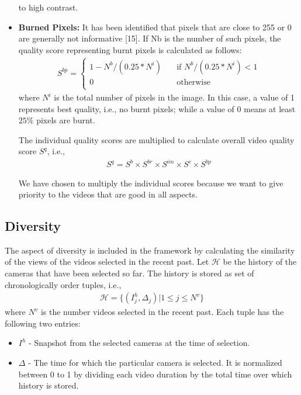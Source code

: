 \documentclass{sig-alternate-05-2015}
\begin{document}
\begin{itemize}
to high contrast.
\item \textbf{Burned Pixels:}
It has been identified that pixels that are
close to 255 or 0 are generally not informative [15]. If Nb
is the number of such pixels, the quality score representing
burnt pixels is calculated as follows:
\begin{eqnarray}
S^{bp}=
\begin{cases}
	1-N^b/(0.25*N^i) &\quad\text{if $N^b/(0.25*N^i)<1$}\\
	0 &\quad\text{otherwise}\\
\end{cases}
\end{eqnarray}
where $N^i$ is the total number of pixels in the image. In this
case, a value of 1 represents best quality, i.e., no burnt pixels;
while a value of 0 means at least $25\%$ pixels are burnt.

The individual quality scores are multiplied to calculate overall
video quality score $S^q$, i.e.,
\begin{eqnarray}
S^q = S^b \times S^{br} \times S^{im} \times S^c \times S^{bp}
\end{eqnarray}

We have chosen to multiply the individual scores because we
want to give priority to the videos that are good in all aspects.
\end{itemize}

\subsection{Diversity}

The aspect of diversity is included in the framework by calculating
the similarity of the views of the videos selected in the recent
past. Let $\mathcal{H}$ be the history of the cameras that have been selected
so far. The history is stored as set of chronologically order tuples,
i.e.,
\begin{eqnarray}
\mathcal{H}=\{(I^h_j ,\Delta_j)|1 \leq j \leq N^v\}
\end{eqnarray}
where $N^v$ is the number videos selected in the recent past. Each
tuple has the following two entries:
\begin{itemize}
\item $I^h$ - Snapshot from the selected cameras at the time of selection.
\item $\Delta$ - The time for which the particular camera is selected. It
is normalized between 0 to 1 by dividing each video duration
by the total time over which history is stored.
\end{itemize}
\end{document}
